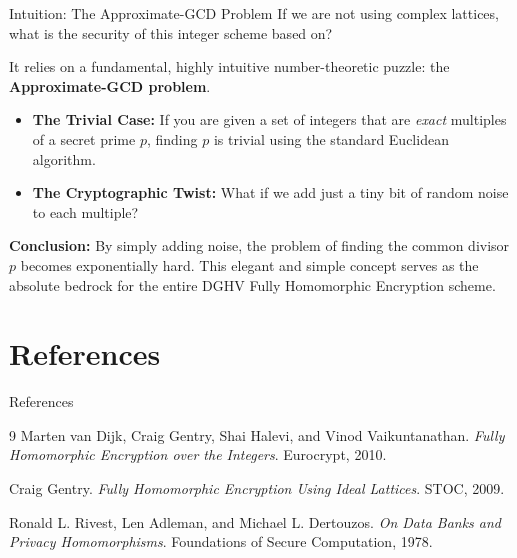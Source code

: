 \documentclass[10pt, aspectratio=169]{beamer}
\begin{document}
\begin{frame}{Intuition: The Approximate-GCD Problem}
    If we are not using complex lattices, what is the security of this integer scheme based on?
    \pause
    
    \vspace{0.3cm}
    It relies on a fundamental, highly intuitive number-theoretic puzzle: the \textbf{Approximate-GCD problem}.
    \pause
    
    \vspace{0.3cm}
    \begin{itemize}
        \item \textbf{The Trivial Case:} If you are given a set of integers that are \textit{exact} multiples of a secret prime $p$, finding $p$ is trivial using the standard Euclidean algorithm.
        \pause
        \item \textbf{The Cryptographic Twist:} What if we add just a tiny bit of random noise to each multiple?
    \end{itemize}
    \pause
    
    \vspace{0.3cm}
    \textbf{Conclusion:} 
    By simply adding noise, the problem of finding the common divisor $p$ becomes exponentially hard. This elegant and simple concept serves as the absolute bedrock for the entire DGHV Fully Homomorphic Encryption scheme.
\end{frame}

\section{References}
\begin{frame}{References}
    \begin{thebibliography}{9} %
        Marten van Dijk, Craig Gentry, Shai Halevi, and Vinod Vaikuntanathan.
        \textit{Fully Homomorphic Encryption over the Integers}. 
        Eurocrypt, 2010.
        
        Craig Gentry.
        \textit{Fully Homomorphic Encryption Using Ideal Lattices}.
        STOC, 2009.
        
        Ronald L. Rivest, Len Adleman, and Michael L. Dertouzos.
        \textit{On Data Banks and Privacy Homomorphisms}.
        Foundations of Secure Computation, 1978.
    \end{thebibliography}
\end{frame}
\end{document}
